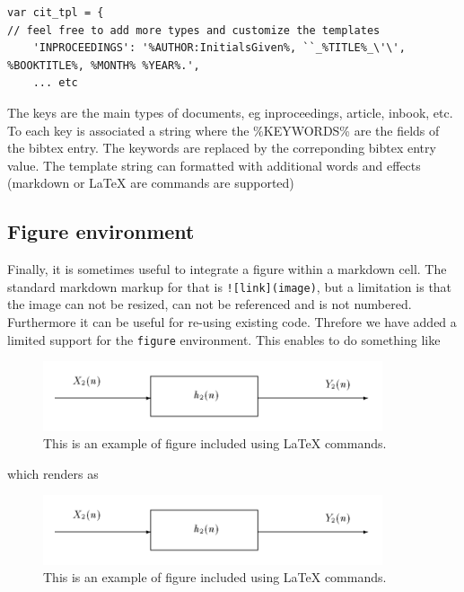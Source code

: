 \begin{verbatim}
var cit_tpl = {
// feel free to add more types and customize the templates
    'INPROCEEDINGS': '%AUTHOR:InitialsGiven%, ``_%TITLE%_\'\', %BOOKTITLE%, %MONTH% %YEAR%.',
    ... etc
\end{verbatim}

The keys are the main types of documents, eg inproceedings, article,
inbook, etc. To each key is associated a string where the \%KEYWORDS\%
are the fields of the bibtex entry. The keywords are replaced by the
correponding bibtex entry value. The template string can formatted with
additional words and effects (markdown or LaTeX are commands are
supported)

    \subsection{Figure environment}\label{figure-environment}

    Finally, it is sometimes useful to integrate a figure within a markdown
cell. The standard markdown markup for that is
\texttt{!{[}link{]}(image)}, but a limitation is that the image can not
be resized, can not be referenced and is not numbered. Furthermore it
can be useful for re-using existing code. Threfore we have added a
limited support for the \texttt{figure} environment. This enables to do
something like

\begin{listing}
\begin{figure}
\centerline{\includegraphics[width=10cm]{example.png}}
\caption{\label{fig:example} This is an example of figure included using LaTeX commands.}
\end{figure}
\end{listing}

which renders as

\begin{figure}
\centerline{\includegraphics[width=10cm]{example.png}}
\caption{\label{fig:example} This is an example of figure included using LaTeX commands.}
\end{figure}

